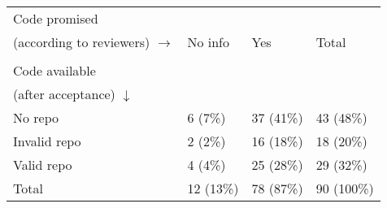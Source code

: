 \begin{tabular}{|l|l|l|l|}
\hline
Code promised & && \\
(according to reviewers) $\rightarrow$ & No info & Yes  &Total\\
&&&\\
Code available & && \\(after acceptance) $\downarrow$ & && \\
\hline
 No repo & 6 (7\%)& 37 (41\%)& 43 (48\%)\\
 Invalid repo & 2 (2\%)& 16 (18\%)& 18 (20\%)\\
 Valid repo & 4 (4\%)& 25 (28\%)& 29 (32\%)\\
 Total & 12 (13\%)& 78 (87\%)& 90 (100\%)\\
\hline
\end{tabular}
